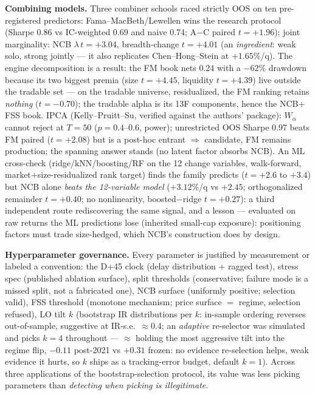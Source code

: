 \documentclass[10pt]{article}
\begin{document}
\textbf{Combining models.} Three combiner schools raced strictly OOS
on ten pre-registered predictors: Fama--MacBeth/Lewellen wins the
research protocol (Sharpe 0.86 vs IC-weighted 0.69 and naive 0.74;
A$-$C paired $t=+1.96$); joint marginality: NCB $\lambda\,t=+3.04$,
breadth-change $t=+4.01$ (an \emph{ingredient}: weak solo, strong
jointly --- it also replicates Chen--Hong--Stein at $+1.65\%$/q).
The engine decomposition is a result: the FM book nets 0.24 with a
$-62\%$ drawdown because its two biggest premia (size $t=+4.45$,
liquidity $t=+4.39$) live outside the tradable set --- on the
tradable universe, residualized, the FM ranking retains
\emph{nothing} ($t=-0.70$); the tradable alpha is its 13F
components, hence the NCB$+$FSS book. IPCA (Kelly--Pruitt--Su,
verified against the authors' package): $W_\alpha$ cannot reject at
$T{=}50$ ($p=0.4$--$0.6$, power); unrestricted OOS Sharpe 0.97
beats FM paired ($t=+2.08$) but is a post-hoc entrant $\Rightarrow$
candidate, FM remains production; the spanning answer stands (no
latent factor absorbs NCB). An ML cross-check (ridge/kNN/boosting/RF
on the 12 change variables, walk-forward, market$+$size-residualized
rank target) finds the family predicts ($t=+2.6$ to $+3.4$) but NCB
alone \emph{beats the 12-variable model} ($+3.12\%$/q vs $+2.45$;
orthogonalized remainder $t=+0.40$; no nonlinearity, boosted$-$ridge
$t=+0.27$): a third independent route rediscovering the same signal,
and a lesson --- evaluated on raw returns the ML predictions lose
(inherited small-cap exposure): positioning factors must trade
size-hedged, which NCB's construction does by design.

\textbf{Hyperparameter governance.} Every parameter is justified by
measurement or labeled a convention: the D+45 clock (delay
distribution $+$ ragged test), stress spec (published ablation
surface), split thresholds (conservative; failure mode is a missed
split, not a fabricated one), NCB surface (uniformly positive;
selection valid), FSS threshold (monotone mechanism; price surface
$=$ regime, selection refused), LO tilt $k$ (bootstrap IR
distributions per $k$: in-sample ordering reverses out-of-sample,
suggestive at IR-s.e.\ $\approx$0.4; an \emph{adaptive} re-selector
was simulated and picks $k{=}4$ throughout --- $\approx$ holding
the most aggressive tilt into the regime flip, $-0.11$ post-2021 vs
$+0.31$ frozen: no evidence re-selection helps, weak evidence it
hurts, so $k$ ships as a tracking-error budget, default $k{=}1$).
Across three applications of the bootstrap-selection protocol, its
value was less picking parameters than \emph{detecting when picking
is illegitimate}.
\end{document}
